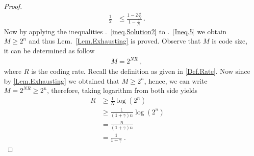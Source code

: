 \begin{proof}
\begin{align}
    \frac{1}{2} &\leq \frac{1-2\frac{d}{N}}{1-\frac{d}{N}}\,.\,
\end{align}
Now by applying the inequalities  .~\eqref{ineq.Solution2} to .~\eqref{Ineq.5} we obtain $M\geq2^n$ and thus Lem.~\ref{Lem.Exhausting} is proved.
Observe that $M$ is code size, it can be determined as follow
\begin{align}
    M = 2^{NR} \;,\,
\end{align}
where $R$ is the coding rate. Recall the definition as given in \eqref{Def.Rate}. Now since by \ref{Lem.Exhausting} we obtained that $M \geq 2^n$, hence, we can write $M = 2^{NR} \geq 2^n$, therefore, taking logarithm from both side yields
\begin{align}
\label{lowerbound.Rate}
    R & \geq \frac{1}{N} \log \left(2^n\right)
    \nonumber\\
    & \geq \frac{1}{(1+\gamma)n} \log \left(2^n\right)
    \nonumber\\
    & = \frac{n}{(1+\gamma)n}
    \nonumber\\
    & = \frac{1}{1+\gamma} \;.\,
\end{align}

\end{proof}
